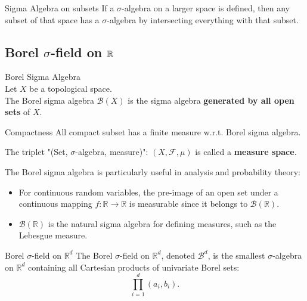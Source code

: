 \begin{prop}{Sigma Algebra on subsets}
\noindent If a $\sigma$-algebra on a larger space is defined, then any subset of that space has a $\sigma$-algebra by intersecting everything with that subset.	
\end{prop}



\subsection{Borel $\sigma$-field on ${\mathbb{R}}$}
\begin{df}{Borel Sigma Algebra}\\
Let \(X\) be a topological space. \\
The Borel sigma algebra \(\mathscr{B}(X)\) is the sigma algebra \textbf{generated by all open sets} of $X$.
\end{df}

\begin{lem}{Compactness}
	All compact subset has a finite measure w.r.t. Borel sigma algebra. 
\end{lem}

\begin{rmk}
The triplet "(Set, $\sigma$-algebra, measure)": \((X, \mathscr{F}, \mu)\) is called a \textbf{measure space}.
\end{rmk}

\begin{rmk}
The Borel sigma algebra is particularly useful in analysis and probability theory:
\begin{itemize}
    \item For continuous random variables, the pre-image of an open set under a continuous mapping \( f: \mathbb{R} \to \mathbb{R} \) is measurable since it belongs to \( \mathscr{B}(\mathbb{R}) \).
    \item \( \mathscr{B}(\mathbb{R}) \) is the natural sigma algebra for defining measures, such as the Lebesgue measure.
\end{itemize}
\end{rmk}

\begin{df}{Borel $\sigma$-field on $\mathbb{R}^d$}
The Borel $\sigma$-field on $\mathbb{R}^d$, denoted $\mathscr{B}^d$, is the smallest $\sigma$-algebra on $\mathbb{R}^d$ containing all Cartesian products of univariate Borel sets:
\[
\prod_{i=1}^d (a_i, b_i).
\]
\end{df}


